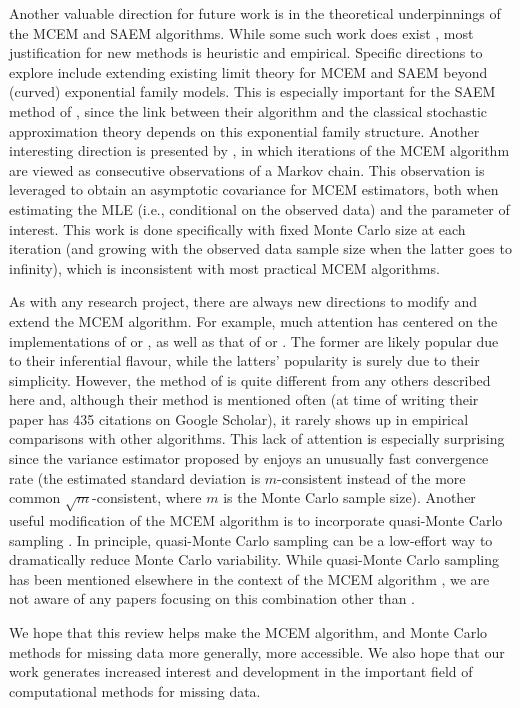 \documentclass[ss]{imsart}
\theoremstyle{plain}
\theoremstyle{definition}
\theoremstyle{remark}
\begin{document}
Another valuable direction for future work is in the theoretical underpinnings of the MCEM and SAEM algorithms. While some such work does exist \citep[e.g.,][]{Del99, For03}, most justification for new methods is heuristic and empirical. Specific directions to explore include extending existing limit theory for MCEM and SAEM beyond (curved) exponential family models. This is especially important for the SAEM method of \citet{Del99}, since the link between their algorithm and the classical stochastic approximation theory depends on this exponential family structure. Another interesting direction is presented by \citet{Nie00}, in which iterations of the MCEM algorithm are viewed as consecutive observations of a Markov chain. This observation is leveraged to obtain an asymptotic covariance for MCEM estimators, both when estimating the MLE (i.e., conditional on the observed data) and the parameter of interest. This work is done specifically with fixed Monte Carlo size at each iteration (and growing with the observed data sample size when the latter goes to infinity), which is inconsistent with most practical MCEM algorithms.

As with any research project, there are always new directions to modify and extend the MCEM algorithm. For example, much attention has centered on the implementations of \citet{Boo99} or \citet{Caf05}, as well as that of \citet{Wei90} or \citet{McC97}. The former are likely popular due to their inferential flavour, while the latters' popularity is surely due to their simplicity. However, the method of \citet{Cha95} is quite different from any others described here and, although their method is mentioned often (at time of writing their paper has 435 citations on Google Scholar), it rarely shows up in empirical comparisons with other algorithms. This lack of attention is especially surprising since the variance estimator proposed by \citeauthor{Cha95} enjoys an unusually fast convergence rate (the estimated standard deviation is $m$-consistent instead of the more common $\sqrt{m}$-consistent, where $m$ is the Monte Carlo sample size). Another useful modification of the MCEM algorithm is to incorporate quasi-Monte Carlo sampling \citep[see][]{Jan05}. In principle, quasi-Monte Carlo sampling can be a low-effort way to dramatically reduce Monte Carlo variability. While quasi-Monte Carlo sampling has been mentioned elsewhere in the context of the MCEM algorithm \citet{Kuo08}, we are not aware of any papers focusing on this combination other than \citet{Jan05}.

We hope that this review helps make the MCEM algorithm, and Monte Carlo methods for missing data more generally, more accessible. We also hope that our work generates increased interest and development in the important field of computational methods for missing data.


% 
% 
\end{document}
